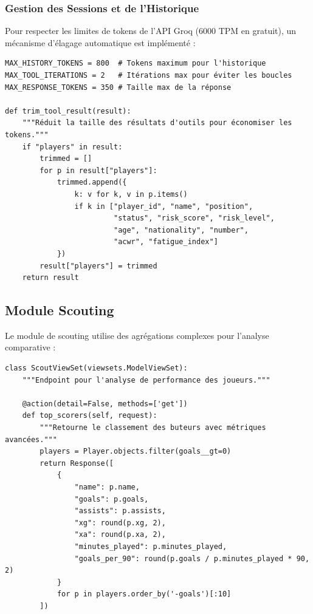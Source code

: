 \subsubsection{Gestion des Sessions et de l'Historique}

Pour respecter les limites de tokens de l'API Groq (6000 TPM en gratuit), un mécanisme d'élagage automatique est implémenté :

\begin{lstlisting}[style=codeframe]
MAX_HISTORY_TOKENS = 800  # Tokens maximum pour l'historique
MAX_TOOL_ITERATIONS = 2   # Itérations max pour éviter les boucles
MAX_RESPONSE_TOKENS = 350 # Taille max de la réponse

def trim_tool_result(result):
    """Réduit la taille des résultats d'outils pour économiser les tokens."""
    if "players" in result:
        trimmed = []
        for p in result["players"]:
            trimmed.append({
                k: v for k, v in p.items()
                if k in ["player_id", "name", "position",
                         "status", "risk_score", "risk_level",
                         "age", "nationality", "number",
                         "acwr", "fatigue_index"]
            })
        result["players"] = trimmed
    return result
\end{lstlisting}

\subsection{Module Scouting}

Le module de scouting utilise des agrégations complexes pour l'analyse comparative :

\begin{lstlisting}[style=codeframe]
class ScoutViewSet(viewsets.ModelViewSet):
    """Endpoint pour l'analyse de performance des joueurs."""

    @action(detail=False, methods=['get'])
    def top_scorers(self, request):
        """Retourne le classement des buteurs avec métriques avancées."""
        players = Player.objects.filter(goals__gt=0)
        return Response([
            {
                "name": p.name,
                "goals": p.goals,
                "assists": p.assists,
                "xg": round(p.xg, 2),
                "xa": round(p.xa, 2),
                "minutes_played": p.minutes_played,
                "goals_per_90": round(p.goals / p.minutes_played * 90, 2)
            }
            for p in players.order_by('-goals')[:10]
        ])
\end{lstlisting}


